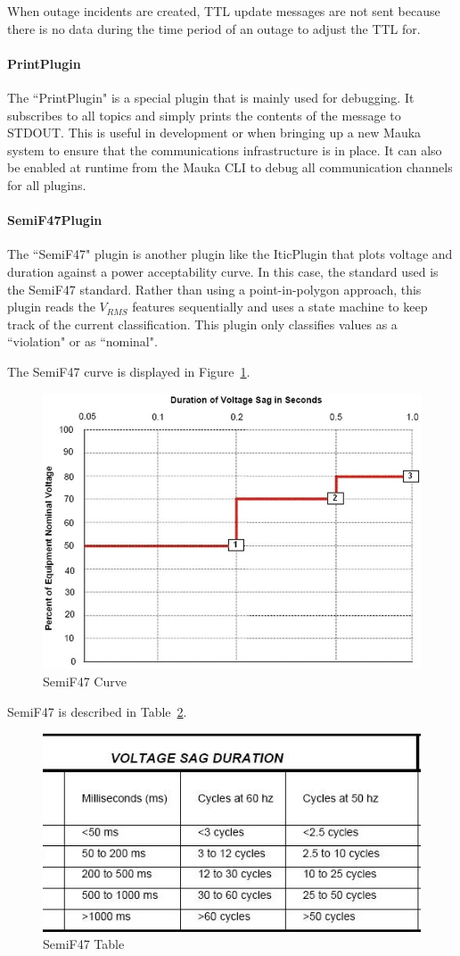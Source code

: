 When outage incidents are created, TTL update messages are not sent because there is no data during the time period of an outage to adjust the TTL for.

\paragraph{PrintPlugin}
The ``PrintPlugin" is a special plugin that is mainly used for debugging. It subscribes to all topics and simply prints the contents of the message to STDOUT. This is useful in development or when bringing up a new Mauka system to ensure that the communications infrastructure is in place. It can also be enabled at runtime from the Mauka CLI to debug all communication channels for all plugins.

\paragraph{SemiF47Plugin}
The ``SemiF47" plugin is another plugin like the IticPlugin that plots voltage and duration against a power acceptability curve. In this case, the standard used is the SemiF47 standard\cite{semif47}. Rather than using a point-in-polygon approach, this plugin reads the $V_{RMS}$ features sequentially and uses a state machine to keep track of the current classification. This plugin only classifies values as a ``violation" or as ``nominal".

The SemiF47 curve is displayed in Figure~\ref{fig:SemiF47Curve}.

\begin{figure}
	\centering
	\includegraphics[width=0.6\linewidth]{figures/semif47.jpg}
	\caption{SemiF47 Curve}
	\label{fig:SemiF47Curve}
\end{figure}

SemiF47 is described in Table~\ref{fig:SemiF47Table}.

\begin{figure}
	\centering
	\includegraphics[width=0.6\linewidth]{figures/semif47_table.jpg}
	\caption{SemiF47 Table}
	\label{fig:SemiF47Table}
\end{figure}


